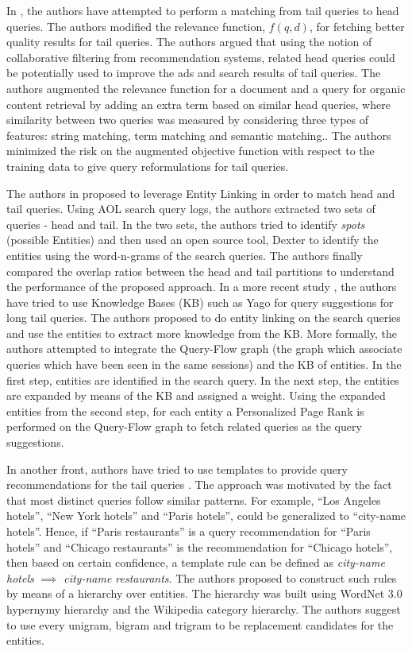 In \cite{zhou2012collaborative}, the authors have attempted to perform a matching from tail queries to head queries. The authors modified the relevance function, $f(q,d)$, for fetching better quality results for tail queries. The authors argued that using the notion of collaborative filtering from recommendation systems, related head queries could be potentially used to improve the ads and search results of tail queries. The authors augmented the relevance function for a document and a query for organic content retrieval by adding an extra term based on similar head queries, where similarity between two queries was measured by considering three types of features: string matching, term matching and semantic matching.. The authors minimized the risk on the augmented objective function with respect to the training data to give query reformulations for tail queries.

The authors in \cite{verma2014bringing} proposed to leverage Entity Linking in order to match head and tail queries. Using AOL search query logs, the authors extracted two sets of queries - head and tail. In the two sets, the authors tried to identify \textit{spots} (possible Entities) and then used an open source tool, Dexter to identify the entities using the word-n-grams of the search queries. The authors finally compared the overlap ratios between the head and tail partitions to understand the performance of the proposed approach. In a more recent study \cite{huang2016kb}, the authors have tried to use Knowledge Bases (KB) such as Yago \cite{YAGO} for query suggestions for long tail queries. The authors proposed to do entity linking on the search queries and use the entities to extract more knowledge from the KB. More formally, the authors attempted to integrate the Query-Flow graph (the graph which associate queries which have been seen in the same sessions) and the KB of entities. In the first step, entities are identified in the search query. In the next step, the entities are expanded by means of the KB and assigned a weight. Using the expanded entities from the second step, for each entity a Personalized Page Rank \cite{chakrabarti2007dynamic} is performed on the Query-Flow graph to fetch related queries as the query suggestions.

In another front, authors have tried to use templates to provide query recommendations for the tail queries \cite{szpektor2011improving}. The approach was motivated by the fact that most distinct queries follow similar patterns. For example, ``Los Angeles hotels'', ``New York hotels'' and ``Paris hotels'', could be generalized to ``city-name hotels''. Hence, if ``Paris restaurants'' is a query recommendation for ``Paris hotels'' and ``Chicago restaurants'' is the recommendation for ``Chicago hotels'', then based on certain confidence, a template rule can be defined as \textit{city-name hotels} $\implies$ \textit{city-name restaurants}. The authors proposed to construct such rules by means of a hierarchy over entities. The hierarchy was built using WordNet 3.0 hypernymy hierarchy and the Wikipedia category hierarchy. The authors suggest to use every unigram, bigram and trigram to be replacement candidates for the entities.


